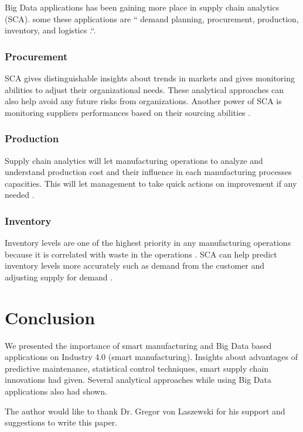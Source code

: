 \documentclass[sigconf]{acmart}
\begin{document}
Big Data applications has been gaining more place in supply chain analytics (SCA). some these applications are `` demand planning, procurement, production, inventory, and logistics \cite{WANG201698}.``. 

\subsubsection{Procurement}

SCA gives distinguishable insights about trends in markets and gives monitoring abilities to adjust their organizational needs. These analytical approaches can also help avoid any future risks from organizations. Another power of SCA is monitoring suppliers performances based on their sourcing abilities \cite{WANG201698}. 

\subsubsection{Production}

Supply chain analytics will let manufacturing operations to analyze and understand production cost and their influence in each manufacturing processes capacities. This will let management to take quick actions on improvement if any needed \cite{WANG201698}.

\subsubsection{Inventory}
Inventory levels are one of the highest priority in any manufacturing operations because it is correlated with waste in the operations \cite{www-toyota}. SCA can help predict inventory levels more accurately such as demand from the customer and adjusting supply for demand \cite{WANG201698}. 






\section{Conclusion}

We presented the importance of smart manufacturing and Big Data based applications on Industry 4.0 (smart manufacturing). Insights about advantages of predictive maintenance, statistical control techniques, smart supply chain innovations had given. Several analytical approaches while using Big Data applications also had shown.

\begin{acks}

The author would like to thank Dr. Gregor von Laszewski for his support and suggestions to write this paper.

\end{acks}


 
\end{document}
